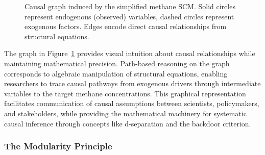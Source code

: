 \begin{figure}[h!]
	\centering
	\caption[Causal graph induced by the simplified methane SCM]{Causal graph induced by the simplified methane SCM. Solid circles represent endogenous (observed) variables, dashed circles represent exogenous factors. Edges encode direct causal relationships from structural equations.}
	\label{fig:methane_dag}
\end{figure}

The graph in Figure~\ref{fig:methane_dag} provides visual intuition about causal relationships while maintaining mathematical precision. Path-based reasoning on the graph corresponds to algebraic manipulation of structural equations, enabling researchers to trace causal pathways from exogenous drivers through intermediate variables to the target methane concentrations. This graphical representation facilitates communication of causal assumptions between scientists, policymakers, and stakeholders, while providing the mathematical machinery for systematic causal inference through concepts like d-separation and the backdoor criterion.

\subsubsection{The Modularity Principle}

